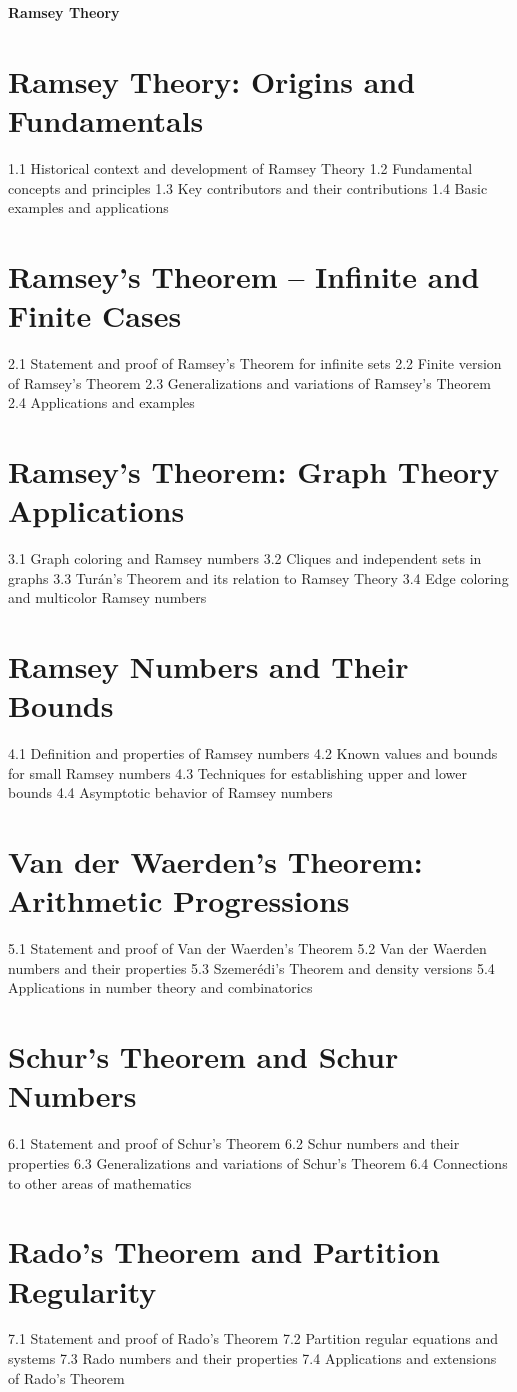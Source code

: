 {\LARGE \bf{Ramsey Theory}}
\section{Ramsey Theory: Origins and Fundamentals}
1.1 Historical context and development of Ramsey Theory
1.2 Fundamental concepts and principles
1.3 Key contributors and their contributions
1.4 Basic examples and applications
\section{Ramsey's Theorem – Infinite and Finite Cases}
2.1 Statement and proof of Ramsey's Theorem for infinite sets
2.2 Finite version of Ramsey's Theorem
2.3 Generalizations and variations of Ramsey's Theorem
2.4 Applications and examples
\section{Ramsey's Theorem: Graph Theory Applications}
3.1 Graph coloring and Ramsey numbers
3.2 Cliques and independent sets in graphs
3.3 Turán's Theorem and its relation to Ramsey Theory
3.4 Edge coloring and multicolor Ramsey numbers
\section{Ramsey Numbers and Their Bounds}
4.1 Definition and properties of Ramsey numbers
4.2 Known values and bounds for small Ramsey numbers
4.3 Techniques for establishing upper and lower bounds
4.4 Asymptotic behavior of Ramsey numbers
\section{Van der Waerden's Theorem: Arithmetic Progressions}
5.1 Statement and proof of Van der Waerden's Theorem
5.2 Van der Waerden numbers and their properties
5.3 Szemerédi's Theorem and density versions
5.4 Applications in number theory and combinatorics
\section{Schur's Theorem and Schur Numbers}
6.1 Statement and proof of Schur's Theorem
6.2 Schur numbers and their properties
6.3 Generalizations and variations of Schur's Theorem
6.4 Connections to other areas of mathematics
\section{Rado's Theorem and Partition Regularity}
7.1 Statement and proof of Rado's Theorem
7.2 Partition regular equations and systems
7.3 Rado numbers and their properties
7.4 Applications and extensions of Rado's Theorem
